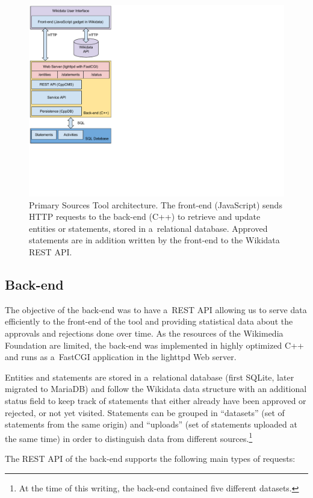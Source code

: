 \documentclass{acm_proc_article-sp}
\begin{document}
\begin{figure}[!htbp]
    \centering
    \includegraphics[width=.65\columnwidth]{img/architecture.pdf}
    \caption{Primary Sources Tool architecture. The front-end (JavaScript) sends
      HTTP requests to the back-end (C++) to retrieve and update entities or
      statements, stored in a~relational database. Approved statements are in
      addition written by the front-end to the Wikidata REST API.}    
    \label{fig:architecture}
\end{figure}

\subsection{Back-end}

The objective of the back-end was to have a~REST API allowing us
to serve data efficiently to the front-end of the tool and
providing statistical data about the approvals and rejections done over time.
As the resources of the Wikimedia Foundation are limited,
the back-end was implemented in highly optimized C++
and runs as a~FastCGI application in the lighttpd Web server.

Entities and statements are stored in a~relational database
(first SQLite, later migrated to MariaDB)
and follow the Wikidata data structure with an additional status field
to keep track of statements that either already have been approved or rejected,
or not yet visited.
Statements can be grouped in ``datasets'' (set of statements from the same origin)
and ``uploads'' (set of statements uploaded at the same time) in order to
distinguish data from different sources.\footnote{At the time of this writing,
the back-end contained five different datasets.}

The REST API of the back-end supports the following main types of requests:
\end{document}
